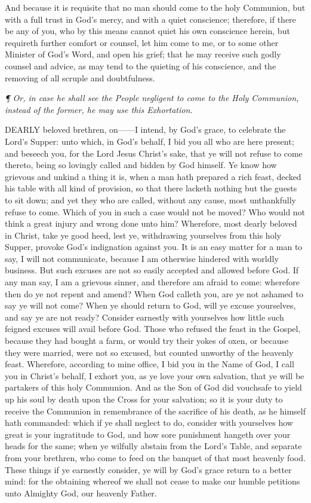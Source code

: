 And because it is requisite that no man should come
tothe holy Communion, but with a full trust in God’s mercy, and
with a quiet conscience; therefore, if there be any of you, who by this
means cannot quiet his own conscience herein, but requireth further comfort
or counsel, let him come to me, or to some other Minister of God’s
Word, and open his grief; that he may receive such godly counsel and advice,
as may tend to the quieting of his conscience, and the removing of all
scruple and doubtfulness. 

\emph{¶
Or, in case he shall see the People negligent to come to the Holy Communion,
instead of the former, he may use this Exhortation.}

DEARLY
beloved brethren, on——I intend, by God’s grace, to celebrate
the Lord's Supper: unto which, in God's behalf, I bid you all who are
here present; and beseech you, for the Lord Jesus Christ's sake, that
ye will not refuse to come thereto, being so lovingly called and bidden
by God himself. Ye know how grievous and unkind a thing it is, when a
man hath prepared a rich feast, decked his table with all kind of provision,
so that there lacketh nothing but the guests to sit down; and yet they
who are called, without any cause, most unthankfully refuse to come. Which
of you in such a case would not be moved? Who would not think a great
injury and wrong done unto him? Wherefore, most dearly beloved in Christ,
take ye good heed, lest ye, withdrawing yourselves from this holy Supper,
provoke God's indignation against you. It is an easy matter for a man
to say, I will not communicate, because I am otherwise hindered with worldly
business. But such excuses are not so easily accepted and allowed before
God. If any man say, I am a grievous sinner, and therefore am afraid to
come: wherefore then do ye not repent and amend? When God calleth you,
are ye not ashamed to say ye will not come? When ye should return to God,
will ye excuse yourselves, and say ye are not ready? Considerearnestly
with yourselves how little such feigned excuses will avail before God.
Those who refused the feast in the Gospel, because they had bought a farm,
or would try their yokes of oxen, or because they were married, were not
so excused, but counted unworthy of the heavenly feast. Wherefore, according
to mine office, I bid you in the Name of God, I call you in Christ's behalf,
I exhort you, as ye love your own salvation, that ye will be partakers
of this holy Communion. And as the Son of God did vouchsafe to yield up
his soul by death upon the Cross for your salvation; so it is your duty
to receive the Communion in remembrance of the sacrifice of his death,
as he himself hath commanded: which if ye shall neglect to do, consider
with yourselves how great is your ingratitude to God, and how sore punishment
hangeth over your heads for the same; when ye wilfully abstain from the
Lord's Table, and separate from your brethren, who come to feed on the
banquet of that most heavenly food. These things if ye earnestly consider,
ye will by God’s grace return to a better mind: for the obtaining
whereof we shall not cease to make our humble petitions unto Almighty
God, our heavenly Father.

